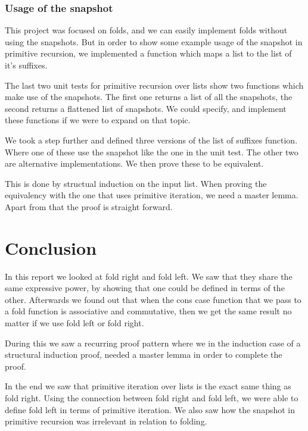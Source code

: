 \documentclass[a4paper]{article}
\begin{document}
\subsubsection{Usage of the snapshot}
This project was focused on folds, and we can easily implement folds without
using the snapshots. But in order to show some example usage of the snapshot in
primitive recursion, we implemented a function which maps a list to the list of
it's suffixes.

The last two unit tests for primitive recursion over lists show two functions
which make use of the snapshots. The first one returns a list of all the
snapshots, the second returns a flattened list of snapshots. We could specify,
and implement these functions if we were to expand on that topic.

We took a step further and defined three versions of the list of suffixes
function. Where one of these use the snapshot like the one in the unit test. The
other two are alternative implementations. We then prove these to be equivalent.

This is done by structual induction on the input list. When proving the
equivalency with the one that uses primitive iteration, we need a master lemma.
Apart from that the proof is straight forward.

\section{Conclusion}
In this report we looked at fold right and fold left. We saw that they share the
same expressive power, by showing that one could be defined in terms of the 
other. Afterwards we found out that when the cons case function that we pass
to a fold function is associative and commutative, then we get the same result
no matter if we use fold left or fold right. 

During this we saw a recurring proof pattern where we in the induction case of a
structural induction proof, needed a master lemma in order to complete the
proof.

In the end we saw that primitive iteration over lists is the exact same
thing as fold right. Using the connection between fold right and fold left, we
were able to define fold left in terms of primitive iteration. We also saw how
the snapshot in primitive recursion was irrelevant in relation to folding.
\end{document}
